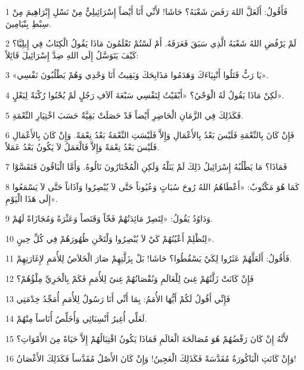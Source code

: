 \par 1 فَأَقُولُ: أَلَعَلَّ اللهَ رَفَضَ شَعْبَهُ؟ حَاشَا! لأَنِّي أَنَا أَيْضاً إِسْرَائِيلِيٌّ مِنْ نَسْلِ إِبْرَاهِيمَ مِنْ سِبْطِ بِنْيَامِينَ.
\par 2 لَمْ يَرْفُضِ اللهُ شَعْبَهُ الَّذِي سَبَقَ فَعَرَفَهُ. أَمْ لَسْتُمْ تَعْلَمُونَ مَاذَا يَقُولُ الْكِتَابُ فِي إِيلِيَّا؟ كَيْفَ يَتَوَسَّلُ إِلَى اللهِ ضِدَّ إِسْرَائِيلَ قَائِلاً:
\par 3 «يَا رَبُّ قَتَلُوا أَنْبِيَاءَكَ وَهَدَمُوا مَذَابِحَكَ وَبَقِيتُ أَنَا وَحْدِي وَهُمْ يَطْلُبُونَ نَفْسِي».
\par 4 لَكِنْ مَاذَا يَقُولُ لَهُ الْوَحْيُ؟ «أَبْقَيْتُ لِنَفْسِي سَبْعَةَ آلاَفِ رَجُلٍ لَمْ يُحْنُوا رُكْبَةً لِبَعْلٍ».
\par 5 فَكَذَلِكَ فِي الزَّمَانِ الْحَاضِرِ أَيْضاً قَدْ حَصَلَتْ بَقِيَّةٌ حَسَبَ اخْتِيَارِ النِّعْمَةِ.
\par 6 فَإِنْ كَانَ بِالنِّعْمَةِ فَلَيْسَ بَعْدُ بِالأَعْمَالِ وَإِلاَّ فَلَيْسَتِ النِّعْمَةُ بَعْدُ نِعْمَةً. وَإِنْ كَانَ بِالأَعْمَالِ فَلَيْسَ بَعْدُ نِعْمَةً وَإِلاَّ فَالْعَمَلُ لاَ يَكُونُ بَعْدُ عَمَلاً.
\par 7 فَمَاذَا؟ مَا يَطْلُبُهُ إِسْرَائِيلُ ذَلِكَ لَمْ يَنَلْهُ وَلَكِنِ الْمُخْتَارُونَ نَالُوهُ. وَأَمَّا الْبَاقُونَ فَتَقَسَّوْا
\par 8 كَمَا هُوَ مَكْتُوبٌ: «أَعْطَاهُمُ اللهُ رُوحَ سُبَاتٍ وَعُيُوناً حَتَّى لاَ يُبْصِرُوا وَآذَاناً حَتَّى لاَ يَسْمَعُوا إِلَى هَذَا الْيَوْمِ».
\par 9 وَدَاوُدُ يَقُولُ: «لِتَصِرْ مَائِدَتُهُمْ فَخّاً وَقَنَصاً وَعَثْرَةً وَمُجَازَاةً لَهُمْ.
\par 10 لِتُظْلِمْ أَعْيُنُهُمْ كَيْ لاَ يُبْصِرُوا وَلْتَحْنِ ظُهُورَهُمْ فِي كُلِّ حِينٍ».
\par 11 فَأَقُولُ: أَلَعَلَّهُمْ عَثَرُوا لِكَيْ يَسْقُطُوا؟ حَاشَا! بَلْ بِزَلَّتِهِمْ صَارَ الْخَلاَصُ لِلأُمَمِ لإِغَارَتِهِمْ.
\par 12 فَإِنْ كَانَتْ زَلَّتُهُمْ غِنىً لِلْعَالَمِ وَنُقْصَانُهُمْ غِنىً لِلأُمَمِ فَكَمْ بِالْحَرِيِّ مِلْؤُهُمْ؟
\par 13 فَإِنِّي أَقُولُ لَكُمْ أَيُّهَا الأُمَمُ: بِمَا أَنِّي أَنَا رَسُولٌ لِلأُمَمِ أُمَجِّدُ خِدْمَتِي
\par 14 لَعَلِّي أُغِيرُ أَنْسِبَائِي وَأُخَلِّصُ أُنَاساً مِنْهُمْ.
\par 15 لأَنَّهُ إِنْ كَانَ رَفْضُهُمْ هُوَ مُصَالَحَةَ الْعَالَمِ فَمَاذَا يَكُونُ اقْتِبَالُهُمْ إِلاَّ حَيَاةً مِنَ الأَمْوَاتِ؟
\par 16 وَإِنْ كَانَتِ الْبَاكُورَةُ مُقَدَّسَةً فَكَذَلِكَ الْعَجِينُ! وَإِنْ كَانَ الأَصْلُ مُقَدَّساً فَكَذَلِكَ الأَغْصَانُ!
